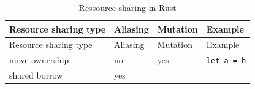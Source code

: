 \begin{longtable}[]{@{}llll@{}}
\caption{Ressource sharing in Rust}\tabularnewline
\toprule
\begin{minipage}[b]{0.31\columnwidth}\raggedright\strut
Resource sharing type\strut
\end{minipage} & \begin{minipage}[b]{0.16\columnwidth}\raggedright\strut
Aliasing\strut
\end{minipage} & \begin{minipage}[b]{0.16\columnwidth}\raggedright\strut
Mutation\strut
\end{minipage} & \begin{minipage}[b]{0.26\columnwidth}\raggedright\strut
Example\strut
\end{minipage}\tabularnewline
\midrule
\endfirsthead
\toprule
\begin{minipage}[b]{0.31\columnwidth}\raggedright\strut
Resource sharing type\strut
\end{minipage} & \begin{minipage}[b]{0.16\columnwidth}\raggedright\strut
Aliasing\strut
\end{minipage} & \begin{minipage}[b]{0.16\columnwidth}\raggedright\strut
Mutation\strut
\end{minipage} & \begin{minipage}[b]{0.26\columnwidth}\raggedright\strut
Example\strut
\end{minipage}\tabularnewline
\midrule
\endhead
\begin{minipage}[t]{0.31\columnwidth}\raggedright\strut
move ownership\strut
\end{minipage} & \begin{minipage}[t]{0.16\columnwidth}\raggedright\strut
no\strut
\end{minipage} & \begin{minipage}[t]{0.16\columnwidth}\raggedright\strut
yes\strut
\end{minipage} & \begin{minipage}[t]{0.26\columnwidth}\raggedright\strut
\texttt{let\ a\ =\ b}\strut
\end{minipage}\tabularnewline
\begin{minipage}[t]{0.31\columnwidth}\raggedright\strut
shared borrow\strut
\end{minipage} & \begin{minipage}[t]{0.16\columnwidth}\raggedright\strut
yes\strut
\end{minipage} & \begin{minipage}[t]{0.16\columnwidth}\raggedright\strut

\end{minipage}
\end{longtable}
